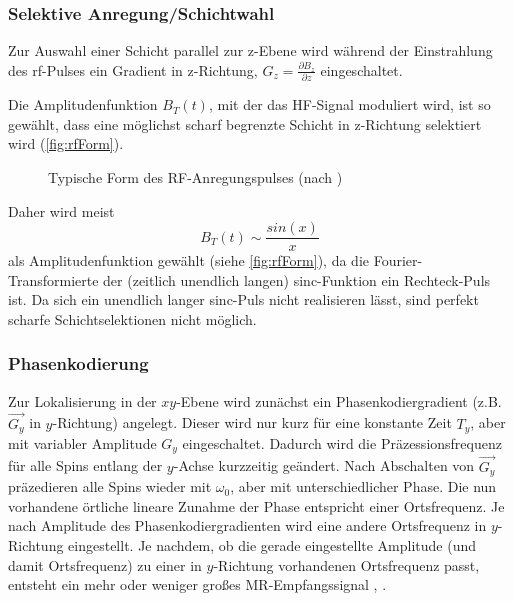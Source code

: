 \subsubsection{Selektive Anregung/Schichtwahl}
Zur Auswahl einer Schicht parallel zur z-Ebene wird während der Einstrahlung des \gls{rf}-Pulses ein Gradient in z-Richtung, $G_z=\frac{\partial B_z}{\partial z}$ eingeschaltet.

Die Amplitudenfunktion $B_T(t)$, mit der das HF-Signal moduliert wird, ist so gewählt, dass eine möglichst scharf begrenzte Schicht in z-Richtung selektiert wird (\autoref{fig:rfForm}).

\begin{figure}[H]
	\centering
	\caption[Form des RF-Anregungspulses]{Typische Form des RF-Anregungspulses (nach \cite[S.~326]{Doessel2016})}
	\label{fig:rfForm}
\end{figure}

Daher wird meist
\begin{equation}
	B_T(t) \sim \frac{sin(x)}{x}
\end{equation}
als Amplitudenfunktion gewählt (siehe \autoref{fig:rfForm}), da die Fourier-Transformierte der (zeitlich unendlich langen) sinc-Funktion ein Rechteck-Puls ist. Da sich ein unendlich langer sinc-Puls nicht realisieren lässt, sind perfekt scharfe Schichtselektionen nicht möglich.

\subsubsection{Phasenkodierung}
Zur Lokalisierung in der $xy$-Ebene wird zunächst ein Phasenkodiergradient (z.B. $\vec{G_y}$ in $y$-Richtung) angelegt. Dieser wird nur kurz für eine konstante Zeit $T_y$, aber mit variabler Amplitude $G_y$ eingeschaltet. Dadurch wird die Präzessionsfrequenz für alle Spins entlang der $y$-Achse kurzzeitig geändert. Nach Abschalten von $\vec{G_y}$ präzedieren alle Spins wieder mit $\omega_0$, aber mit unterschiedlicher Phase. Die nun vorhandene örtliche lineare Zunahme der Phase entspricht einer Ortsfrequenz. Je nach Amplitude des Phasenkodiergradienten wird eine andere Ortsfrequenz in $y$-Richtung eingestellt. Je nachdem, ob die gerade eingestellte Amplitude (und damit Ortsfrequenz) zu einer in $y$-Richtung vorhandenen Ortsfrequenz passt, entsteht ein mehr oder weniger großes MR-Empfangssignal \cite{Bushong2014}, \cite{Edelstein1980}.

